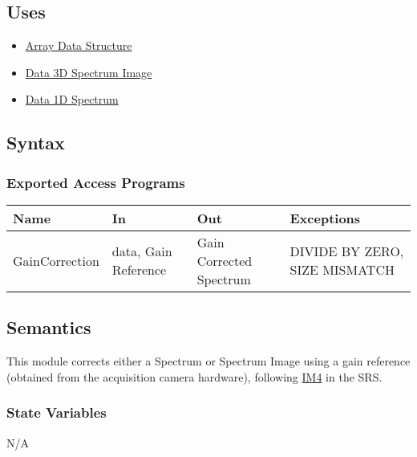 \documentclass[12pt, titlepage]{article}
\begin{document}
\subsection{Uses}
\begin{itemize}
    \item \hyperref[Mod:Array]{Array Data Structure}
    \item \hyperref[Mod:SI]{Data 3D Spectrum Image}
    \item \hyperref[Mod:Spectrum]{Data 1D Spectrum}
\end{itemize}

\subsection{Syntax}

\subsubsection{Exported Access Programs}

\begin{center}
\begin{tabular}{p{3cm} p{4cm} p{4cm} p{4cm}}
\hline
\textbf{Name} & \textbf{In} & \textbf{Out} & \textbf{Exceptions} \\
\hline
GainCorrection & data, Gain Reference & Gain Corrected Spectrum & DIVIDE BY ZERO, SIZE MISMATCH \\
\hline
\end{tabular}
\end{center}

\subsection{Semantics}
This module corrects either a Spectrum or Spectrum Image using a gain reference (obtained from the acquisition camera hardware), following \hyperref[gain]{IM4} in the SRS.

\subsubsection{State Variables}
N/A
\end{document}
